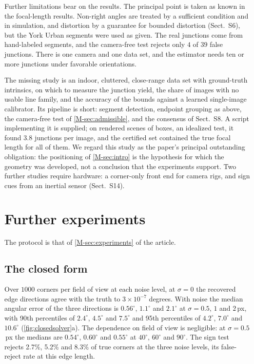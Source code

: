 Further limitations bear on the results. The principal point is taken as known in the focal-length results. Non-right angles are treated by a sufficient condition and in simulation, and distortion by a guarantee for bounded distortion (Sect.~S6), but the York Urban segments were used as given. The real junctions come from hand-labeled segments, and the camera-free test rejects only $4$ of $39$ false junctions. There is one camera and one data set, and the estimator needs ten or more junctions under favorable orientations.

The missing study is an indoor, cluttered, close-range data set with ground-truth intrinsics, on which to measure the junction yield, the share of images with no usable line family, and the accuracy of the bounds against a learned single-image calibrator. Its pipeline is short: segment detection, endpoint grouping as above, the camera-free test of \cref{M-sec:admissible}, and the consensus of Sect.~S8. A script implementing it is supplied; on rendered scenes of boxes, an idealized test, it found $3.8$ junctions per image, and the certified set contained the true focal length for all of them. We regard this study as the paper's principal outstanding obligation: the positioning of \cref{M-sec:intro} is the hypothesis for which the geometry was developed, not a conclusion that the experiments support. Two further studies require hardware: a corner-only front end for camera rigs, and sign cues from an inertial sensor (Sect.~S14).

\section{Further experiments}\label{sec:Sexp}

The protocol is that of \cref{M-sec:experiments} of the article.

\subsection{The closed form}
Over $1000$ corners per field of view at each noise level, at $\sigma=0$ the recovered edge directions agree with the truth to $3\times10^{-7}$ degrees. With noise the median angular error of the three directions is $0.56^\circ$, $1.1^\circ$ and $2.1^\circ$ at $\sigma=0.5$, $1$ and $2$\,px, with 90th percentiles of $2.4^\circ$, $4.5^\circ$ and $7.5^\circ$ and 95th percentiles of $4.2^\circ$, $7.0^\circ$ and $10.6^\circ$ (\cref{fig:closedsolver}a). The dependence on field of view is negligible: at $\sigma=0.5$\,px the medians are $0.54^\circ$, $0.60^\circ$ and $0.55^\circ$ at $40^\circ$, $60^\circ$ and $90^\circ$. The sign test rejects 2.7\%, 5.2\% and 8.3\% of true corners at the three noise levels, its false-reject rate at this edge length.

